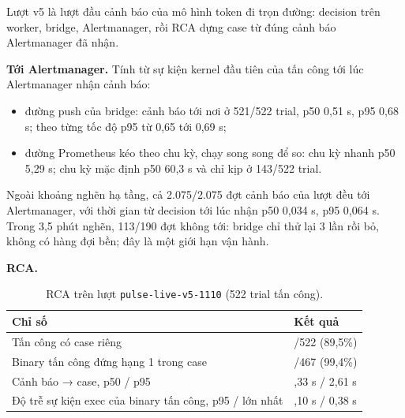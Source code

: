Lượt v5 là lượt đầu cảnh báo của mô hình token đi trọn đường: decision trên worker, bridge, Alertmanager, rồi RCA dựng case từ đúng cảnh báo Alertmanager đã nhận.

\textbf{Tới Alertmanager.} Tính từ sự kiện kernel đầu tiên của tấn công tới lúc Alertmanager nhận cảnh báo:

\begin{itemize}
\tightlist
\item
  đường push của bridge: cảnh báo tới nơi ở 521/522 trial, p50 0,51 s, p95 0,68 s; theo từng tốc độ p95 từ 0,65 tới 0,69 s;
\item
  đường Prometheus kéo theo chu kỳ, chạy song song để so: chu kỳ nhanh p50 5,29 s; chu kỳ mặc định p50 60,3 s và chỉ kịp ở 143/522 trial.
\end{itemize}

Ngoài khoảng nghẽn hạ tầng, cả 2.075/2.075 đợt cảnh báo của lượt đều tới Alertmanager, với thời gian từ decision tới lúc nhận p50 0,034 s, p95 0,064 s. Trong 3,5 phút nghẽn, 113/190 đợt không tới: bridge chỉ thử lại 3 lần rồi bỏ, không có hàng đợi bền; đây là một giới hạn vận hành.

\textbf{RCA.}

\begin{longtable}[]{@{}>{\raggedright\arraybackslash}p{}>{\raggedright\arraybackslash}p{}@{}}
\caption{RCA trên lượt \texttt{pulse-\allowbreak{}live-\allowbreak{}v5-\allowbreak{}1110} (522 trial tấn công).}\label{tab:rca}\\
\toprule\noalign{}
Chỉ số & Kết quả \\
\midrule\noalign{}
\endhead
\bottomrule\noalign{}
\endlastfoot
Tấn công có case riêng & 467/522 (89,5\%) \\
Binary tấn công đứng hạng 1 trong case & 464/467 (99,4\%) \\
Cảnh báo → case, p50 / p95 & 2,33 s / 2,61 s \\
Độ trễ sự kiện exec của binary tấn công, p95 / lớn nhất & 0,10 s / 0,38 s \\
\end{longtable}

